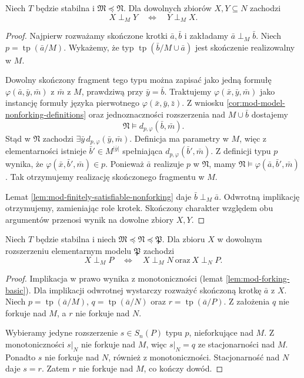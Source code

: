 \begin{twierdzenie}
\label{thm:mod-forking-symmetry-model}
Niech $T$ będzie stabilna i
$\mathfrak M\preccurlyeq\mathfrak N$.
Dla dowolnych zbiorów $X,Y\subseteq N$
zachodzi
\[
X\mathrel{\perp_M}Y
\quad\Longleftrightarrow\quad
Y\mathrel{\perp_M}X.
\]
\end{twierdzenie}
\begin{proof}
Najpierw rozważamy skończone krotki
$\bar a,\bar b$ i zakładamy
$\bar a\mathrel{\perp_M}\bar b$.
Niech $p=\operatorname{tp}(\bar a/M)$.
Wykażemy, że typ $\operatorname{tp}(\bar b/M\cup\bar a)$
jest skończenie realizowalny w $M$.

Dowolny skończony fragment tego typu można
zapisać jako jedną formułę
$\varphi(\bar a,\bar y,\bar m)$
z $\bar m$ z $M$, prawdziwą przy $\bar y=\bar b$.
Traktujemy $\varphi(\bar x,\bar y,\bar m)$
jako instancję formuły języka pierwotnego
$\varphi(\bar x,\bar y,\bar z)$.
Z wniosku \ref{cor:mod-model-nonforking-definitions}
oraz jednoznaczności rozszerzenia nad
$M\cup\bar b$ dostajemy
\[
\mathfrak N\models d_{p,\varphi}(\bar b,\bar m).
\]
Stąd w $\mathfrak N$ zachodzi
$\exists\bar y\,d_{p,\varphi}(\bar y,\bar m)$.
Definicja ma parametry w $M$, więc z elementarności
istnieje $\bar b'\in M^{|\bar y|}$
spełniająca $d_{p,\varphi}(\bar b',\bar m)$.
Z definicji typu $p$ wynika, że
$\varphi(\bar x,\bar b',\bar m)\in p$.
Ponieważ $\bar a$ realizuje $p$ w $\mathfrak N$,
mamy $\mathfrak N\models\varphi(\bar a,\bar b',\bar m)$.
Tak otrzymujemy realizację skończonego
fragmentu w $M$.

Lemat \ref{lem:mod-finitely-satisfiable-nonforking}
daje $\bar b\mathrel{\perp_M}\bar a$.
Odwrotną implikację otrzymujemy,
zamieniając role krotek.
Skończony charakter względem obu argumentów
przenosi wynik na dowolne zbiory $X,Y$.
\end{proof}

\begin{twierdzenie}
\label{thm:mod-forking-transitivity-model}
Niech $T$ będzie stabilna i niech
$\mathfrak M\preccurlyeq\mathfrak N
\preccurlyeq\mathfrak P$.
Dla zbioru $X$ w dowolnym rozszerzeniu
elementarnym modelu $\mathfrak P$ zachodzi
\[
X\mathrel{\perp_M}P
\quad\Longleftrightarrow\quad
X\mathrel{\perp_M}N\ \text{oraz}\
X\mathrel{\perp_N}P.
\]
\end{twierdzenie}
\begin{proof}
Implikacja w prawo wynika z monotoniczności
(lemat \ref{lem:mod-forking-basic}).
Dla implikacji odwrotnej wystarczy
rozważyć skończoną krotkę $\bar a$ z $X$.
Niech $p=\operatorname{tp}(\bar a/M)$,
$q=\operatorname{tp}(\bar a/N)$ oraz
$r=\operatorname{tp}(\bar a/P)$.
Z założenia $q$ nie forkuje nad $M$,
a $r$ nie forkuje nad $N$.

Wybieramy jedyne rozszerzenie $s\in S_n(P)$
typu $p$, nieforkujące nad $M$.
Z monotoniczności $s|_N$ nie forkuje nad $M$,
więc $s|_N=q$ ze stacjonarności nad $M$.
Ponadto $s$ nie forkuje nad $N$,
również z monotoniczności.
Stacjonarność nad $N$ daje $s=r$.
Zatem $r$ nie forkuje nad $M$,
co kończy dowód.
\end{proof}

